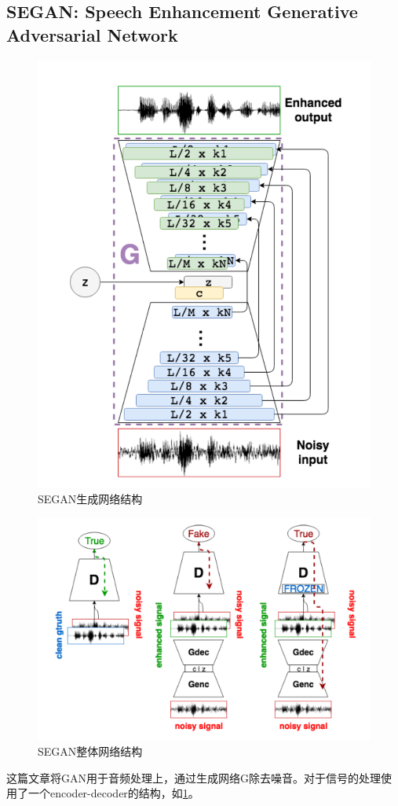 \documentclass[a4paper]{article}
\begin{document}
\subsection{SEGAN: Speech Enhancement Generative Adversarial Network\cite{DBLP:journals/corr/PascualBS17}}
\begin{figure}
\centering
\includegraphics[width=\textwidth]{./img/43.png}
\caption{SEGAN生成网络结构}
\label{fig:43}
\end{figure}

\begin{figure}
\centering
\includegraphics[width=\textwidth]{./img/42.png}
\caption{SEGAN整体网络结构}
\label{fig:42}
\end{figure}
这篇文章将GAN用于音频处理上，通过生成网络G除去噪音。对于信号的处理使用了一个encoder-decoder的结构，如\ref{fig:43}。
\end{document}
